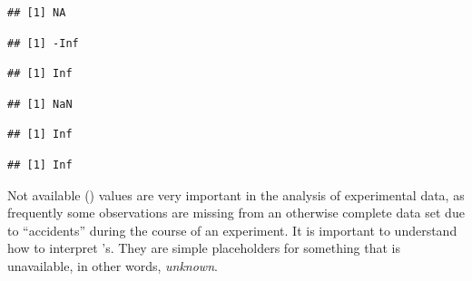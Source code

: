 \documentclass[krantz2]{krantz}\usepackage{knitr}
\begin{document}
\begin{knitrout}\footnotesize
{}\color{fgcolor}\begin{kframe}
\begin{alltt}
 \hlkwb{<-} 
\end{alltt}
\begin{verbatim}
## [1] NA
\end{verbatim}
\begin{alltt}
\hlopt{-} \hlopt{/} 
\end{alltt}
\begin{verbatim}
## [1] -Inf
\end{verbatim}
\begin{alltt}
 \hlopt{/} 
\end{alltt}
\begin{verbatim}
## [1] Inf
\end{verbatim}
\begin{alltt}
 \hlopt{/} 
\end{alltt}
\begin{verbatim}
## [1] NaN
\end{verbatim}
\begin{alltt}
 \hlopt{+} 
\end{alltt}
\begin{verbatim}
## [1] Inf
\end{verbatim}
\begin{alltt}
 \hlkwb{<-} \hlopt{-}
 \hlopt{* -}
\end{alltt}
\begin{verbatim}
## [1] Inf
\end{verbatim}
\end{kframe}
\end{knitrout}

Not available () values are very important in the analysis of experimental data, as frequently some observations are missing from an otherwise complete data set due to ``accidents'' during the course of an experiment. It is important to understand how to interpret 's. They are simple placeholders for something that is unavailable, in other words, \emph{unknown}.
\end{document}
